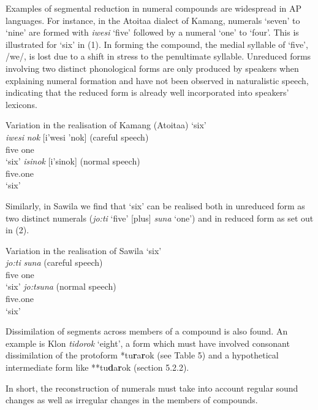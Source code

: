 Examples of segmental reduction in numeral compounds are widespread in AP languages. For instance, in the Atoitaa dialect of Kamang, numerals `seven' to `nine' are formed with \textit{iwesi}\textit{{\ng}} `five' followed by a numeral `one' to `four'. This is illustrated for `six' in (1). In forming the compound, the medial syllable of `five', /we/, is lost due to a shift in stress to the penultimate syllable. Unreduced forms involving two distinct phonological forms are only produced by speakers when explaining numeral formation and have not been observed in naturalistic speech, indicating that the reduced form is already well incorporated into speakers' lexicons.



\ea%
\label{ex:1}
  Variation in the realisation of Kamang (Atoitaa) `six'\\
\ea
\gll\textit{iwesi}\textit{{\ng}} \textit{nok}    [i'wesi{\ng} 'nok]    (careful speech)\\
      five    one    \\
\glt `six'
\ex
\gll\textit{isi}\textit{{\ng}}\textit{nok}        [i'si{\ng}nok]    (normal speech)\\
     five.one  \\
\glt`six'
\z
\z




Similarly, in Sawila we find that `six' can be realised both in unreduced form as two distinct numerals (\textit{jo:ti}\textit{{\ng}} `five' [plus] \textit{suna} `one') and in reduced form as set out in (2).



\ea%
\label{ex:2}
Variation in the realisation of Sawila `six'\\
\ea
\gll\textit{jo:ti}\textit{{\ng}} \textit{suna}          (careful speech)\\
    five    one     \\
\glt`six'
\ex
\gll\textit{jo:tsuna}            (normal speech)\\
      five.one  \\
\glt   `six'
\z
\z




Dissimilation of segments across members of a compound is also found. An example is Klon \textit{tidorok} `eight', a form which must have involved consonant dissimilation of the protoform *tu\textbf{r}a\textbf{r}ok (see Table 5) and a hypothetical intermediate form like **tu\textbf{d}a\textbf{r}ok (section 5.2.2).

In short, the reconstruction of numerals must take into account regular sound changes as well as irregular changes in the members of compounds.

